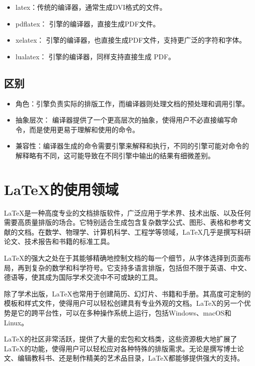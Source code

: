\begin{itemize}
	\item latex：传统的编译器，通常生成DVI格式的文件。
	\item pdflatex： 引擎的编译器，直接生成PDF文件。
	\item xelatex： 引擎的编译器，也直接生成PDF文件，支持更广泛的字符和字体。
	\item lualatex： 引擎的编译器，同样支持直接生成 PDF。
\end{itemize}

\subsection*{区别}
\begin{itemize}
	\item 角色：引擎负责实际的排版工作，而编译器则处理文档的预处理和调用引擎。
	\item 抽象层次： 编译器提供了一个更高层次的抽象，使得用户不必直接编写命令，而是使用更易于理解和使用的命令。
	\item 兼容性：编译器生成的命令需要引擎来解释和执行，不同的引擎可能对命令的解释略有不同，这可能导致在不同引擎中输出的结果有细微差别。
\end{itemize}

\section{\LaTeX 的使用领域}
\LaTeX 是一种高度专业的文档排版软件，广泛应用于学术界、技术出版、以及任何需要高质量排版的场合。它特别适合生成包含复杂数学公式、图形、表格和参考文献的文档。在数学、物理学、计算机科学、工程学等领域，\LaTeX 几乎是撰写科研论文、技术报告和书籍的标准工具。

\LaTeX 的强大之处在于其能够精确地控制文档的每一个细节，从字体选择到页面布局，再到复杂的数学和科学符号。它支持多语言排版，包括但不限于英语、中文、德语等，使其成为国际学术交流中不可或缺的工具。

除了学术出版，\LaTeX 也常用于创建简历、幻灯片、书籍和手册。其高度可定制的模板和样式文件，使得用户可以轻松创建具有专业外观的文档。\LaTeX 的另一个优势是它的跨平台性，可以在多种操作系统上运行，包括Windows、macOS和Linux。

\LaTeX 的社区非常活跃，提供了大量的宏包和文档类，这些资源极大地扩展了\LaTeX 的功能，使得用户可以轻松应对各种特殊的排版需求。无论是撰写博士论文、编辑教科书、还是制作精美的艺术品目录，\LaTeX 都能够提供强大的支持。

